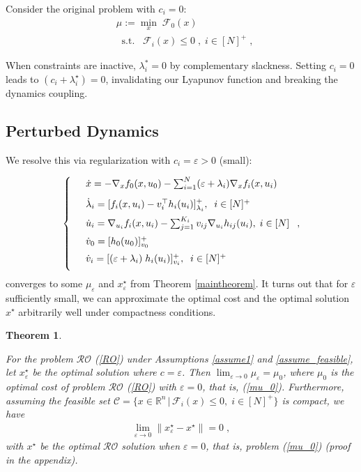\documentclass[journal,twoside,web]{ieeecolor}
\newcommand{\rev}[1]{\textcolor{revisionblue}{#1}}
\newtheorem{theorem}{Theorem}
\begin{document}
Consider the original problem with $c_i=0$:
\begin{align} \label{mu_0}
&\mu:=\underset{x}{\min} \; \mathcal{F}_0(x)\\
&\;\;\text{s.t.}\;\;\;\mathcal{F}_i(x)\leq 0\;,\;i\in[N]^+\;,\nonumber
\end{align}

When constraints are inactive, $\lambda_i^* = 0$ by complementary slackness. Setting $c_i = 0$ leads to $(c_i+\lambda_i^\star)=0$, invalidating our Lyapunov function and breaking the dynamics coupling.

\subsection*{\rev{Perturbed Dynamics}}

We resolve this via regularization with $c_i=\varepsilon>0$ (small):

\begin{align} \label{pd_dynamics_ep}
\left\{
\begin{array}{cl}
\vspace{3mm}
&\dot x=-\nabla_x f_0(x,u_0)- \sum_{i=1}^N(\varepsilon+\lambda_i) \nabla_x f_i(x,u_i)\\
\vspace{2mm}
&\dot \lambda_i=[f_i(x,u_i)-v_i^\top h_i(u_i)]_{\lambda_i}^+,\;\; i\in[N]^+\\
\vspace{2mm}
&\dot u_i=\nabla_{u_i}f_i(x,u_i)-  \sum_{j=1}^{K_i} v_{ij} \nabla_{u_i} h_{ij}(u_i),\; i\in[N]\\
\vspace{2mm}
&\dot{v}_0=[h_0(u_0)]_{v_0}^+\\
\vspace{2mm}
&\dot v_i=[(\varepsilon+\lambda_i) \; h_i(u_i)]_{v_i}^+,\;\;i\in[N]^+
\end{array}\right.,
\end{align}
converges to some $\mu_{\varepsilon}$ and $x^\star_{\varepsilon}$ from Theorem \ref{maintheorem}. It turns out that for $\varepsilon$ sufficiently small, we can approximate the optimal cost and the optimal solution $x^\star$ arbitrarily well under compactness conditions.

\begin{theorem} \label{RO_ROperturbed}

For the problem $\mathcal{RO}$ (\ref{RO}) under Assumptions \ref{assume1} and \ref{assume_feasible}, let $x^\star_\varepsilon$ be the optimal solution where $c=\varepsilon$. Then
$\displaystyle\lim_{\varepsilon \to 0}\mu_\varepsilon=\mu_0$, where $\mu_0$ is the optimal cost of problem $\mathcal{RO}$ (\ref{RO}) with $\varepsilon=0$, that is, (\ref{mu_0}). Furthermore, assuming the feasible set $\mathcal{C}=\{x\in \mathbb{R}^n\,|\,\mathcal{F}_i(x)\leq 0,\; i\in[N]^+\}$ is compact, we have
\begin{align*}
\displaystyle\lim_{\varepsilon \to 0} \parallel x_\varepsilon^\star-x^\star \parallel=0\;,
\end{align*}
with $x^\star$ be the optimal $\mathcal{RO}$ solution when $\varepsilon=0$, that is, problem (\ref{mu_0}) (proof in the appendix).
\end{theorem}
\end{document}
